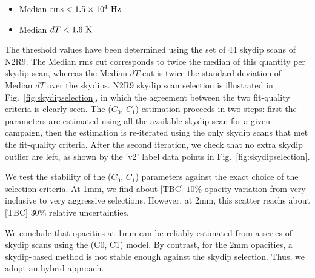 \begin{itemize}
\item Median $\rm{rms} < 1.5 \times 10^{4}~\rm{Hz}$
\item Median $dT < 1.6~\rm{K}$
\end{itemize}

The threshold values have been determined using the set of 44 skydip
scans of N2R9. The Median rms cut corresponds to twice the median of
this quantity per skydip scan, whereas the Median $dT$ cut is twice
the standard deviation of Median $dT$ over the skydips. N2R9 skydip
scan selection is illustrated in Fig.~\ref{fig:skydipselection}, in
which the agreement between the two fit-quality criteria is clearly
seen. The ($C_0$, $C_1$) estimation proceeds in two steps: first the
parameters are estimated using all the available skydip scan for a
given campaign, then the estimation is re-iterated using the only
skydip scans that met the fit-quality criteria. After the second
iteration, we check that no extra skydip outlier are left, as shown by
the 'v2' label data points in Fig.~\ref{fig:skydipselection}.


We test the stability of the ($C_0$, $C_1$) parameters against the exact choice of the selection criteria.  
At 1mm, we find about {\color{red} $[$TBC$]$  $10\%$} opacity variation from very inclusive to very aggressive selections. However, at 2mm, this scatter reachs about {\color{red} $[$TBC$]$  $30\%$} relative uncertainties.


We conclude that opacities at 1mm can be reliably estimated from a series of skydip scans using the (C0, C1) model. By contrast, for the 2mm opacities, a skydip-based method is not stable enough against the skydip selection. Thus, we adopt an hybrid approach. 




